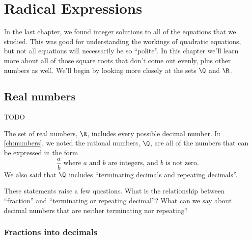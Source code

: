 \chapter{Radical Expressions}
\label{ch:radicals}

\newcommand*\rfrac[2]{{}^{#1}\!/_{#2}}



In the last chapter, we found integer solutions to all of the equations that we studied. This was good for understanding the workings of quadratic equations, but not all equations will necessarily be so ``polite''. In this chapter we'll learn more about all of those square roots that don't come out evenly, plus other numbers as well. We'll begin by looking more closely at the sets $\Q$ and $\R$.

\section{Real numbers}
\label{sec:radrealnumbers}

\begin{boxedexplore}
TODO
\end{boxedexplore}

The set of real numbers, $\R$, includes every possible decimal number. In \cref{ch:numbers}, we noted the rational numbers, $\Q$, are all of the numbers that can be expressed in the form \[\frac{a}{b} \text{ where $a$ and $b$ are integers, and $b$ is not zero.}\]
We also said that $\Q$ includes ``terminating decimals and repeating decimals''. 

These statements raise a few questions. What is the relationship between ``fraction'' and ``terminating or repeating decimal''? What can we say about decimal numbers that are neither terminating nor repeating?

\subsection{Fractions into decimals}

